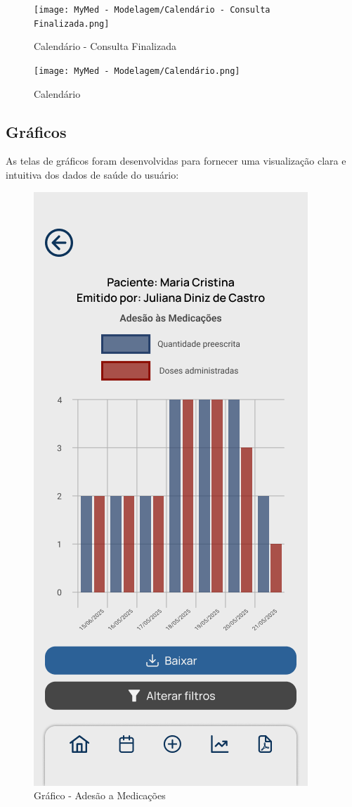 \begin{figure}[!htbp]
	\centering
	\texttt{[image: MyMed - Modelagem/Calendário - Consulta Finalizada.png]}
	\caption{Calendário - Consulta Finalizada}
	\label{calendario_consulta_finalizada}
\end{figure}

\begin{figure}[!htbp]
	\centering
	\texttt{[image: MyMed - Modelagem/Calendário.png]}
	\caption{Calendário}
	\label{calendario}
\end{figure}

\subsection{Gráficos}

As telas de gráficos foram desenvolvidas para fornecer uma visualização clara e intuitiva dos dados de saúde do usuário:

\begin{figure}[!htbp]
	\centering
	\includegraphics[width=0.6\linewidth]{MyMed - Modelagem/Gráfico - Adesão a Medicações.png}
	\caption{Gráfico - Adesão a Medicações}
	\label{grafico_adesao_medicacoes}
\end{figure}

